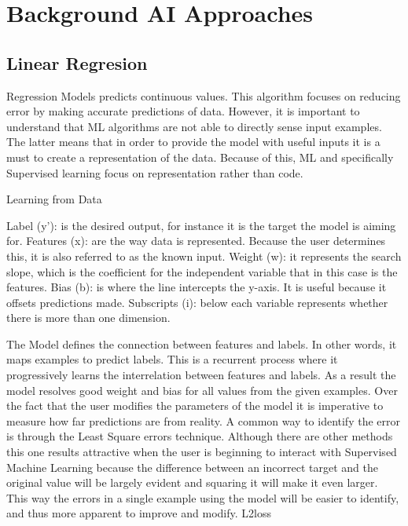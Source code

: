 

\section{Background \acl{AI} Approaches}
\label{sec:related}

\subsection{Linear Regresion}

Regression Models predicts continuous values. This algorithm focuses on reducing error by making accurate predictions of data. However, it is important to understand that ML algorithms are not able to directly sense input examples. The latter means that in order to provide the model with useful inputs it is a must to create a representation of the data. Because of this, ML and specifically Supervised learning focus on representation rather than code. 

Learning from Data



Label (y’): is the desired output, for instance it is the target the model is aiming for.
Features (x):  are the way data is represented. Because the user determines this, it is also referred to as the known input.  
Weight (w):  it represents the search slope, which is the coefficient for the independent variable that in this case is the features.  
Bias (b): is where the line intercepts the y-axis. It is useful because it offsets predictions made. 
Subscripts (i): below each variable represents whether there is more than one dimension.

The Model defines the connection between features and labels. In other words, it maps examples to predict labels. This is a recurrent process where it progressively learns the interrelation between features and labels. As a result the model resolves good weight and bias for all values from the given examples.  Over the fact that the user modifies the parameters of the model it is imperative to measure how far predictions are from reality.  A common way to identify the error is through the Least Square errors technique. Although there are other methods this one results attractive when the user is beginning to interact with Supervised Machine Learning because the difference between an incorrect target and the original value will be largely evident and squaring it will make it even larger. This way the errors in a single example using the model will be easier to identify, and thus more apparent to improve and modify.
L2loss


